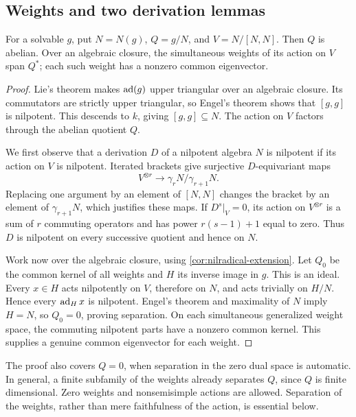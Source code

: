 \subsection{Weights and two derivation lemmas}

\begin{lemma}\label{lem:weight-separation}
For a solvable $g$, put $N=N(g)$,
$Q=g/N$, and $V=N/[N,N]$. Then $Q$ is abelian. Over an
algebraic closure, the simultaneous weights of its action on $V$ span
$Q^*$; each such weight has a nonzero common eigenvector.
\end{lemma}
\begin{proof}
Lie's theorem makes $\operatorname{ad}(g)$ upper triangular over an
algebraic closure. Its commutators are strictly upper triangular, so
Engel's theorem shows that $[g,g]$ is nilpotent.
This descends to $k$, giving $[g,g]\subseteq N$.
The action on $V$ factors through the abelian quotient $Q$.

We first observe that a derivation $D$ of a nilpotent algebra $N$ is
nilpotent if its action on $V$ is nilpotent. Iterated brackets give
surjective $D$-equivariant maps
\[
 V^{\otimes r}\longrightarrow\gamma_rN/\gamma_{r+1}N.
\]
Replacing one argument by an element of $[N,N]$ changes the bracket
by an element of $\gamma_{r+1}N$, which justifies these maps. If
$D^s|_V=0$, its action on $V^{\otimes r}$ is a sum of $r$ commuting
operators and has power $r(s-1)+1$ equal to zero. Thus $D$ is nilpotent
on every successive quotient and hence on $N$.

Work now over the algebraic closure, using
\cref{cor:nilradical-extension}. Let $Q_0$ be the common kernel of all
weights and $H$ its inverse image in $g$. This is an ideal.
Every $x\in H$ acts nilpotently on $V$, therefore on $N$, and acts
trivially on $H/N$. Hence every $\operatorname{ad}_Hx$ is nilpotent. Engel's theorem
and maximality of $N$ imply $H=N$, so $Q_0=0$, proving separation.
On each simultaneous generalized weight space, the commuting
nilpotent parts have a nonzero common kernel. This supplies a genuine
common eigenvector for each weight.
\end{proof}

The proof also covers $Q=0$, when separation in the zero dual space
is automatic. In general, a finite subfamily of the weights already
separates $Q$, since $Q$ is finite dimensional.
Zero weights and nonsemisimple actions are allowed. Separation of the
weights, rather than mere faithfulness of the action, is essential below.

